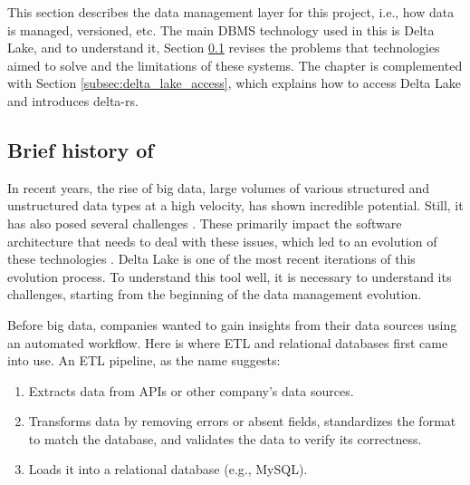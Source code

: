 This section describes the data management layer for this project, i.e., how data is managed, versioned, etc. The main \gls{DBMS} technology used in this is Delta Lake, and to understand it, Section \ref{subsec:history_DBMS} revises the problems that technologies aimed to solve and the limitations of these systems. The chapter is complemented with Section \ref{subsec:delta_lake_access}, which explains how to access Delta Lake and introduces delta-rs.

\subsection{Brief history of }
\label{subsec:history_DBMS}

In recent years, the rise of big data, large volumes of various structured and unstructured data types at a high velocity, has shown incredible potential. Still, it has also posed several challenges \cite{penceWhatBigData2014}. These primarily impact the software architecture that needs to deal with these issues, which led to an evolution of these technologies \cite{gortonDistributionDataDeployment2015}. Delta Lake \cite{armbrustDeltaLakeHighperformance2020} is one of the most recent iterations of this evolution process. To understand this tool well, it is necessary to understand its challenges, starting from the beginning of the data management evolution.

Before big data, companies wanted to gain insights from their data sources using an automated workflow. Here is where \gls{ETL} and relational databases first came into use. An \gls{ETL} pipeline, as the name suggests:
\begin{enumerate}
    \item Extracts data from \glspl{API} or other company's data sources.
    \item Transforms data by removing errors or absent fields, standardizes the format to match the database, and validates the data to verify its correctness.
    \item Loads it into a relational database (e.g., MySQL).
\end{enumerate} 

